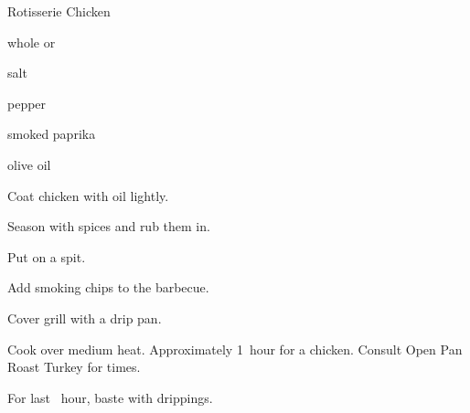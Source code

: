\begin{recipe}{Rotisserie Chicken}{}{}

\begin{ingredients}
\item whole  or 
\item salt
\item pepper
\item smoked paprika
\item olive oil
\end{ingredients}

\begin{directions}
\item Coat chicken with oil lightly.
\item Season with spices and rub them in.
\item Put on a spit.
\item Add smoking chips to the barbecue.
\item Cover grill with a drip pan.
\item Cook over medium heat. Approximately 1~hour for a chicken. Consult Open Pan Roast Turkey for times.
\item For last \half~hour, baste with drippings.
\end{directions}

\end{recipe}
